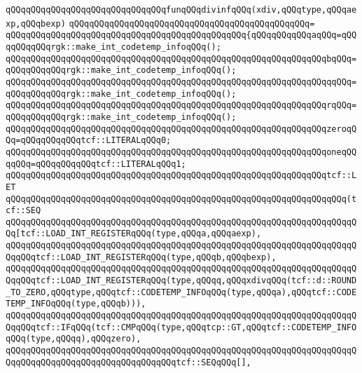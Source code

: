 \verb|qQQqqQQqqQQqqQQqqQQqqQQqqQQqqQQqfunqQQqdivinfqQQq(xdiv,qQQqtype,qQQqaexp,qQQqbexp)|\newline
\verb|qQQqqQQqqQQqqQQqqQQqqQQqqQQqqQQqqQQqqQQqqQQqqQQq=|\newline
\verb|qQQqqQQqqQQqqQQqqQQqqQQqqQQqqQQqqQQqqQQqqQQqqQQq{qQQqqQQqqQQqaqQQq=qQQqqQQqqQQqrgk::make_int_codetemp_infoqQQq();|\newline
\verb|qQQqqQQqqQQqqQQqqQQqqQQqqQQqqQQqqQQqqQQqqQQqqQQqqQQqqQQqqQQqqQQqbqQQq=qQQqqQQqqQQqrgk::make_int_codetemp_infoqQQq();|\newline
\verb|qQQqqQQqqQQqqQQqqQQqqQQqqQQqqQQqqQQqqQQqqQQqqQQqqQQqqQQqqQQqqQQqqqQQq=qQQqqQQqqQQqrgk::make_int_codetemp_infoqQQq();|\newline
\verb|qQQqqQQqqQQqqQQqqQQqqQQqqQQqqQQqqQQqqQQqqQQqqQQqqQQqqQQqqQQqqQQqrqQQq=qQQqqQQqqQQqrgk::make_int_codetemp_infoqQQq();|\newline
\newline
\verb|qQQqqQQqqQQqqQQqqQQqqQQqqQQqqQQqqQQqqQQqqQQqqQQqqQQqqQQqqQQqqQQqzeroqQQq=qQQqqQQqqQQqtcf::LITERALqQQq0;|\newline
\verb|qQQqqQQqqQQqqQQqqQQqqQQqqQQqqQQqqQQqqQQqqQQqqQQqqQQqqQQqqQQqqQQqoneqQQqqQQq=qQQqqQQqqQQqtcf::LITERALqQQq1;|\newline
\newline
\verb|qQQqqQQqqQQqqQQqqQQqqQQqqQQqqQQqqQQqqQQqqQQqqQQqqQQqqQQqqQQqqQQqtcf::LET|\newline
\verb|qQQqqQQqqQQqqQQqqQQqqQQqqQQqqQQqqQQqqQQqqQQqqQQqqQQqqQQqqQQqqQQqqQQq(tcf::SEQ|\newline
\verb|qQQqqQQqqQQqqQQqqQQqqQQqqQQqqQQqqQQqqQQqqQQqqQQqqQQqqQQqqQQqqQQqqQQqqQQq[tcf::LOAD_INT_REGISTERqQQq(type,qQQqa,qQQqaexp),|\newline
\verb|qQQqqQQqqQQqqQQqqQQqqQQqqQQqqQQqqQQqqQQqqQQqqQQqqQQqqQQqqQQqqQQqqQQqqQQqqQQqtcf::LOAD_INT_REGISTERqQQq(type,qQQqb,qQQqbexp),|\newline
\verb|qQQqqQQqqQQqqQQqqQQqqQQqqQQqqQQqqQQqqQQqqQQqqQQqqQQqqQQqqQQqqQQqqQQqqQQqqQQqtcf::LOAD_INT_REGISTERqQQq(type,qQQqq,qQQqxdivqQQq(tcf::d::ROUND_TO_ZERO,qQQqtype,qQQqtcf::CODETEMP_INFOqQQq(type,qQQqa),qQQqtcf::CODETEMP_INFOqQQq(type,qQQqb))),|\newline
\verb|qQQqqQQqqQQqqQQqqQQqqQQqqQQqqQQqqQQqqQQqqQQqqQQqqQQqqQQqqQQqqQQqqQQqqQQqqQQqtcf::IFqQQq(tcf::CMPqQQq(type,qQQqtcp::GT,qQQqtcf::CODETEMP_INFOqQQq(type,qQQqq),qQQqzero),|\newline
\verb|qQQqqQQqqQQqqQQqqQQqqQQqqQQqqQQqqQQqqQQqqQQqqQQqqQQqqQQqqQQqqQQqqQQqqQQqqQQqqQQqqQQqqQQqqQQqqQQqqQQqqQQqtcf::SEQqQQq[],|\newline
